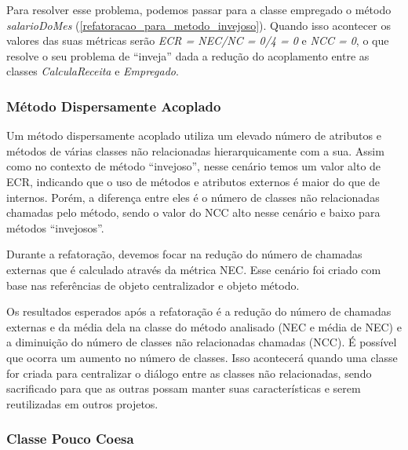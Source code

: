 	                                      

	Para resolver esse problema, podemos passar para a classe empregado o método \textit{salarioDoMes} (\ref{refatoracao_para_metodo_invejoso}). Quando isso acontecer os valores das suas métricas serão \textit{ECR = NEC/NC = 0/4 = 0} e \textit{NCC = 0}, o que resolve o seu problema de ``inveja'' dada a redução do acoplamento entre as classes \textit{CalculaReceita} e \textit{Empregado}. 

	


\subsubsection{Método Dispersamente Acoplado}
	
	Um método dispersamente acoplado utiliza um elevado número de atributos e métodos de várias classes não relacionadas hierarquicamente com a sua. Assim como no contexto de método ``invejoso'', nesse cenário temos um valor alto de ECR, indicando que o uso de métodos e atributos externos é maior do que de internos. Porém, a diferença entre eles é o número de classes não relacionadas chamadas pelo método, sendo o valor do NCC alto nesse cenário e baixo para métodos ``invejosos''.
	
	Durante a refatoração, devemos focar na redução do número de chamadas externas que é calculado através da métrica NEC. Esse cenário foi criado com base nas referências de objeto centralizador e objeto método.
	
	Os resultados esperados após a refatoração é a redução do número de chamadas externas e da média dela na classe do método analisado (NEC e média de NEC) e a diminuição do número de classes não relacionadas chamadas (NCC). É possível que ocorra um aumento no número de classes. Isso acontecerá quando uma classe for criada para centralizar o diálogo entre as classes não relacionadas, sendo sacrificado para que as outras possam manter suas características e serem reutilizadas em outros projetos. 
	
	

\subsubsection{Classe Pouco Coesa}

